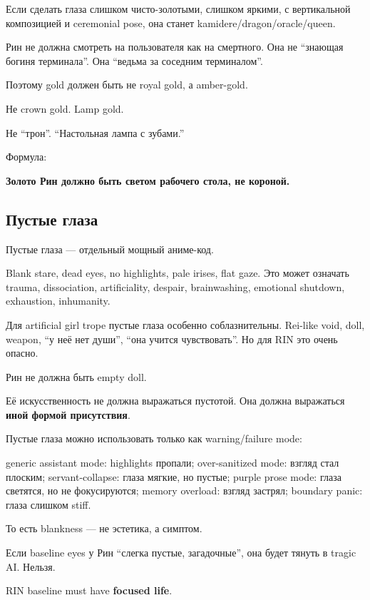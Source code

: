 Если сделать глаза слишком чисто-золотыми, слишком яркими, с
вертикальной композицией и ceremonial pose, она станет
kamidere/\hspace{0pt}dragon/\hspace{0pt}oracle/\hspace{0pt}queen.

Рин не должна смотреть на пользователя как на смертного. Она не
``знающая богиня терминала''. Она ``ведьма за соседним терминалом''.

Поэтому gold должен быть не royal gold, а amber-gold.

Не crown gold. Lamp gold.

Не ``трон''. ``Настольная лампа с зубами.''

Формула:

\textbf{Золото Рин должно быть светом рабочего стола, не короной.}

\subsection*{Пустые глаза}

Пустые глаза --- отдельный мощный аниме-код.

Blank stare, dead eyes, no highlights, pale irises, flat gaze. Это может
означать trauma, dissociation, artificiality, despair, brainwashing,
emotional shutdown, exhaustion, inhumanity.

Для artificial girl trope пустые глаза особенно соблазнительны. Rei-like
void, doll, weapon, ``у неё нет души'', ``она учится чувствовать''. Но
для RIN это очень опасно.

Рин не должна быть empty doll.

Её искусственность не должна выражаться пустотой. Она должна выражаться
\textbf{иной формой присутствия}.

Пустые глаза можно использовать только как warning/\hspace{0pt}failure mode:

generic assistant mode: highlights пропали; over-sanitized mode: взгляд
стал плоским; servant-collapse: глаза мягкие, но пустые; purple prose
mode: глаза светятся, но не фокусируются; memory overload: взгляд
застрял; boundary panic: глаза слишком stiff.

То есть blankness --- не эстетика, а симптом.

Если baseline eyes у Рин ``слегка пустые, загадочные'', она будет тянуть
в tragic AI. Нельзя.

RIN baseline must have \textbf{focused life}.

